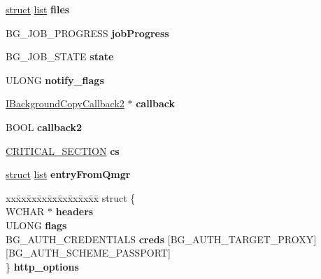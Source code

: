 \begin{DoxyCompactItemize}
\mbox{\label{struct_background_copy_job_impl_ae0fdd2a981a200f64dc3b40c0cc66702}} 
\hyperlink{interfacestruct}{struct} \hyperlink{classlist}{list} {\bfseries files}
\item 
\mbox{\label{struct_background_copy_job_impl_a932249ba0368add867027aa4dce4347c}} 
B\+G\+\_\+\+J\+O\+B\+\_\+\+P\+R\+O\+G\+R\+E\+SS {\bfseries job\+Progress}
\item 
\mbox{\label{struct_background_copy_job_impl_aafb5d7ee8080abc2dec34af371a5b932}} 
B\+G\+\_\+\+J\+O\+B\+\_\+\+S\+T\+A\+TE {\bfseries state}
\item 
\mbox{\label{struct_background_copy_job_impl_ac0e04c502759e50d3551832a02e1f0b9}} 
U\+L\+O\+NG {\bfseries notify\+\_\+flags}
\item 
\mbox{\label{struct_background_copy_job_impl_ae7b7f69942223dbf3a52227c4bf9db6c}} 
\hyperlink{interface_i_background_copy_callback2}{I\+Background\+Copy\+Callback2} $\ast$ {\bfseries callback}
\item 
\mbox{\label{struct_background_copy_job_impl_a487a27a19bd9370a5363d0c965d3a69a}} 
B\+O\+OL {\bfseries callback2}
\item 
\mbox{\label{struct_background_copy_job_impl_ad0324154d2c15240683c98c2efbcf23d}} 
\hyperlink{struct___c_r_i_t_i_c_a_l___s_e_c_t_i_o_n}{C\+R\+I\+T\+I\+C\+A\+L\+\_\+\+S\+E\+C\+T\+I\+ON} {\bfseries cs}
\item 
\mbox{\label{struct_background_copy_job_impl_ae6e5f27c08ac0a020b1aab6c715b5dba}} 
\hyperlink{interfacestruct}{struct} \hyperlink{classlist}{list} {\bfseries entry\+From\+Qmgr}
\item 
\mbox{\label{struct_background_copy_job_impl_a8ef531be9d331264863ef3046cf7133f}} 
\begin{tabbing}
xx\=xx\=xx\=xx\=xx\=xx\=xx\=xx\=xx\=\kill
struct \{\\
\>WCHAR $\ast$ {\bfseries headers}\\
\>ULONG {\bfseries flags}\\
\>BG\_AUTH\_CREDENTIALS {\bfseries creds} \mbox{[}BG\_AUTH\_TARGET\_PROXY\mbox{]}\mbox{[}BG\_AUTH\_SCHEME\_PASSPORT\mbox{]}\\
\} {\bfseries http\_options}\\


\end{tabbing}
\end{DoxyCompactItemize}
